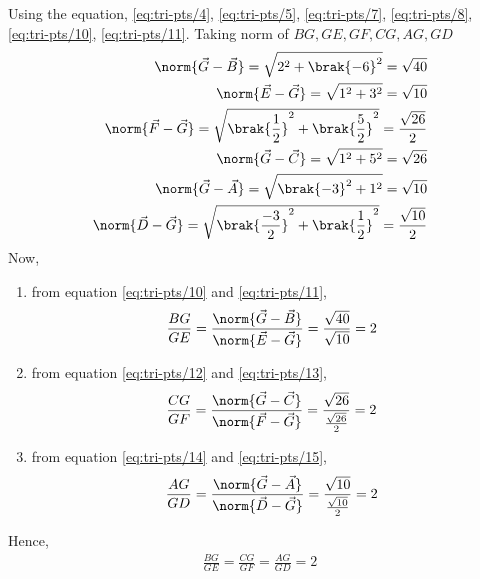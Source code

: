\documentclass[journal,12pt,twocolumn]{IEEEtran}
\theoremstyle{remark}
\begin{document}
Using the equation,
 		\eqref{eq:tri-pts/4},
		\eqref{eq:tri-pts/5},
		\eqref{eq:tri-pts/7},
		\eqref{eq:tri-pts/8},
		\eqref{eq:tri-pts/10},
		\eqref{eq:tri-pts/11}.
Taking norm of $BG,GE,GF,CG,AG,GD$ 
\begin{align}
		\label{eq:tri-pts/10} \norm{\vec{G}-\vec{B}} = \sqrt{2^2 + \brak{-6}^{2}} = \sqrt{40} \\
		\label{eq:tri-pts/11} \norm{\vec{E}-\vec{G}} = \sqrt{1^2 + 3^2} = \sqrt{10} \\
		\label{eq:tri-pts/12} \norm{\vec{F}-\vec{G}} = \sqrt{\brak{\frac{1}{2}}^{2} + \brak{\frac{5}{2}}^{2}} = \frac{\sqrt{26}}{2} \\  
		\label{eq:tri-pts/13} \norm{\vec{G}-\vec{C}} = \sqrt{1^2 + 5^2} = \sqrt{26} \\
		\label{eq:tri-pts/14} \norm{\vec{G}-\vec{A}} = \sqrt{\brak{-3}^{2}+1^2} = \sqrt{10} \\
		\label{eq:tri-pts/15} \norm{\vec{D}-\vec{G}} = \sqrt{\brak{\frac{-3}{2}}^{2}+\brak{\frac{1}{2}}^{2}} = \frac{\sqrt{10}}{2}  
\end{align}
Now,
\begin{enumerate}
\item from equation \eqref{eq:tri-pts/10} and \eqref{eq:tri-pts/11},   
\begin{align}
		\frac{BG}{GE} = \frac{\norm{\vec{G}-\vec{B}}}{\norm{\vec{E}-\vec{G}}} = \frac{\sqrt{40}}{\sqrt{10}} = 2 
\end{align}
\item from equation \eqref{eq:tri-pts/12} and \eqref{eq:tri-pts/13},
\begin{align} 
		\frac{CG}{GF} = \frac{\norm{\vec{G}-\vec{C}}}{\norm{\vec{F}-\vec{G}}} = \frac{\sqrt{26}}{\frac{\sqrt{26}}{2}} = 2 
\end{align}
\item from equation \eqref{eq:tri-pts/14} and \eqref{eq:tri-pts/15},
\begin{align}
		\frac{AG}{GD} = \frac{\norm{\vec{G}-\vec{A}}}{\norm{\vec{D}-\vec{G}}} = \frac{\sqrt{10}}{\frac{\sqrt{10}}{2}} = 2 
\end{align}
\end{enumerate}
Hence,
\begin{align}
		\frac{BG}{GE} = 
		\frac{CG}{GF} =
		\frac{AG}{GD} = 2
\end{align}
\end{document}
